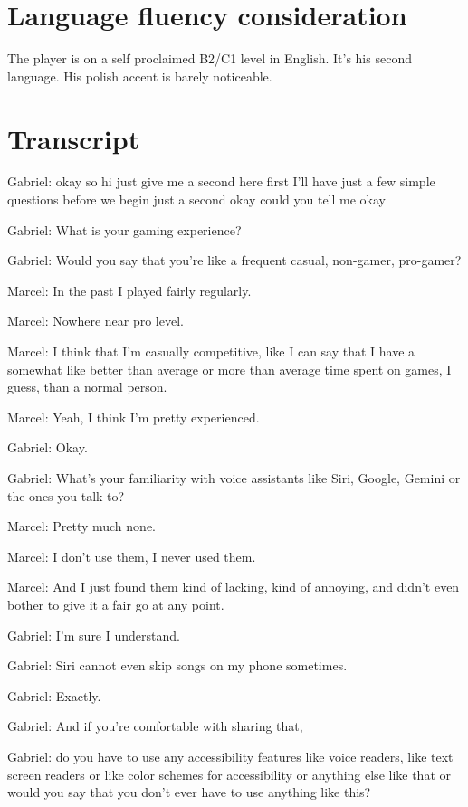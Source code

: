\section{Language fluency consideration}


The player is on a self proclaimed B2/C1 level in English. It's his second language. His polish accent is barely noticeable.
\section{Transcript}
Gabriel: okay so hi just give me a second here first I'll have just a few simple questions before we begin just a second okay could you tell me okay

Gabriel: What is your gaming experience?

Gabriel: Would you say that you're like a frequent casual, non-gamer, pro-gamer?

Marcel: In the past I played fairly regularly.

Marcel: Nowhere near pro level.

Marcel: I think that I'm casually competitive, like I can say that I have a somewhat like better than average or more than average time spent on games, I guess, than a normal person.

Marcel: Yeah, I think I'm pretty experienced.

Gabriel: Okay.

Gabriel: What's your familiarity with voice assistants like Siri, Google, Gemini or the ones you talk to?

Marcel: Pretty much none.

Marcel: I don't use them, I never used them.

Marcel: And I just found them kind of lacking, kind of annoying, and didn't even bother to give it a fair go at any point.

Gabriel: I'm sure I understand.

Gabriel: Siri cannot even skip songs on my phone sometimes.

Gabriel: Exactly.

Gabriel: And if you're comfortable with sharing that,

Gabriel: do you have to use any accessibility features like voice readers, like text screen readers or like color schemes for accessibility or anything else like that or would you say that you don't ever have to use anything like this?

